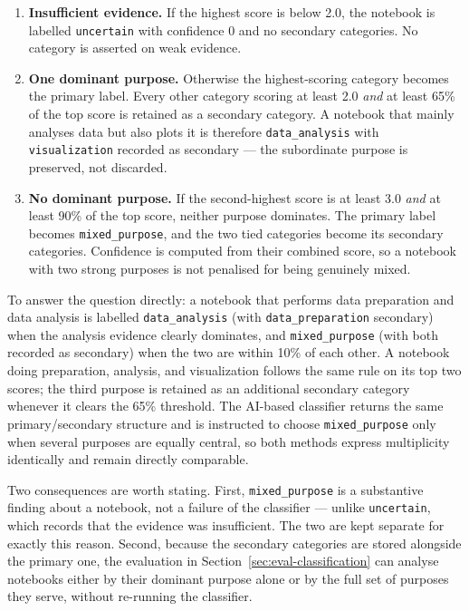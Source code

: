 \begin{enumerate}[label=\textbf{Case \arabic*.},leftmargin=1.9cm,itemsep=0.3em,topsep=0.3em]
\item \textbf{Insufficient evidence.} If the highest score is below 2.0, the notebook is labelled \texttt{uncertain} with confidence 0 and no secondary categories. No category is asserted on weak evidence.
\item \textbf{One dominant purpose.} Otherwise the highest-scoring category becomes the primary label. Every other category scoring at least 2.0 \emph{and} at least 65\% of the top score is retained as a secondary category. A notebook that mainly analyses data but also plots it is therefore \texttt{data\_analysis} with \texttt{visualization} recorded as secondary --- the subordinate purpose is preserved, not discarded.
\item \textbf{No dominant purpose.} If the second-highest score is at least 3.0 \emph{and} at least 90\% of the top score, neither purpose dominates. The primary label becomes \texttt{mixed\_purpose}, and the two tied categories become its secondary categories. Confidence is computed from their combined score, so a notebook with two strong purposes is not penalised for being genuinely mixed.
\end{enumerate}

To answer the question directly: a notebook that performs data preparation and data analysis is labelled \texttt{data\_analysis} (with \texttt{data\_preparation} secondary) when the analysis evidence clearly dominates, and \texttt{mixed\_purpose} (with both recorded as secondary) when the two are within 10\% of each other. A notebook doing preparation, analysis, and visualization follows the same rule on its top two scores; the third purpose is retained as an additional secondary category whenever it clears the 65\% threshold. The AI-based classifier returns the same primary/secondary structure and is instructed to choose \texttt{mixed\_purpose} only when several purposes are equally central, so both methods express multiplicity identically and remain directly comparable.

Two consequences are worth stating. First, \texttt{mixed\_purpose} is a substantive finding about a notebook, not a failure of the classifier --- unlike \texttt{uncertain}, which records that the evidence was insufficient. The two are kept separate for exactly this reason. Second, because the secondary categories are stored alongside the primary one, the evaluation in Section~\ref{sec:eval-classification} can analyse notebooks either by their dominant purpose alone or by the full set of purposes they serve, without re-running the classifier.


